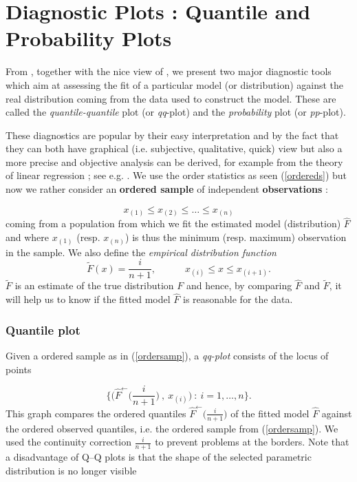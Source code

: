 \section{Diagnostic Plots : Quantile and Probability Plots}\label{app:qqpp}

From \citet[pp.18-36]{beirlant_practical_1996}, together with the nice view of \citet[pp.36-37]{coles_introduction_2001}, we present two major diagnostic tools which aim at assessing the fit of a particular model (or distribution) against the real distribution coming from the data used to construct the model.
These are called the \emph{quantile-quantile} plot (or \emph{qq}-plot) and the \emph{probability} plot (or \emph{pp}-plot). 

These diagnostics are popular by their easy interpretation and by the fact that they can both have graphical (i.e. subjective, qualitative, quick) view but also a more precise and objective analysis can be derived, for example from the theory of linear regression ; see e.g. \citet[chap.1]{beirlant_statistics_2006}. 
\newline
We use the order statistics as seen (\ref{ordereds}) but now we rather consider an \textbf{ordered sample} of independent \textbf{observations} :

\begin{equation} \label{ordersamp}
x_{(1)}\leq x_{(2)}\leq\dots\leq x_{(n)}
\end{equation}
coming from a population from which we fit the estimated model (distribution) $\hat{F}$ and where $x_{(1)}$ (resp. $x_{(n)}$) is thus the minimum (resp. maximum) observation in the sample. We also define the \emph{empirical distribution function}
\begin{equation}\label{eq:emprdist}
\tilde{F}(x)=\frac{i}{n+1}, \qquad\quad x_{(i)}\leq x\leq x_{(i+1)}.
\end{equation}
$\tilde{F}$ is an estimate of the true distribution $F$ and hence, by comparing $\hat{F}$ and $\tilde{F}$, it will help us to know if the fitted model $\hat{F}$ is reasonable for the data.

\subsubsection*{Quantile plot} Given a ordered sample as in (\ref{ordersamp}), a \emph{qq-plot} consists of the locus of points 

\begin{equation}
\Bigg\{\bigg(\hat{F}^{\leftarrow}\Big(\frac{i}{n+1}\Big)\ ,\ x_{(i)}\bigg) \ : \ i=1,\dots,n\Bigg\}.
\end{equation}
This graph compares the ordered quantiles $\hat{F}^{\leftarrow}\Big(\frac{i}{n+1}\Big)$ of the fitted model $\hat{F}$ against the ordered observed quantiles, i.e. the ordered sample from (\ref{ordersamp}).
We used the continuity correction $\frac{i}{n+1}$ to prevent problems at the borders.
Note that a disadvantage of Q–Q plots is that the shape of the selected
parametric distribution is no longer visible \citet[pp.63]{beirlant_statistics_2006}

